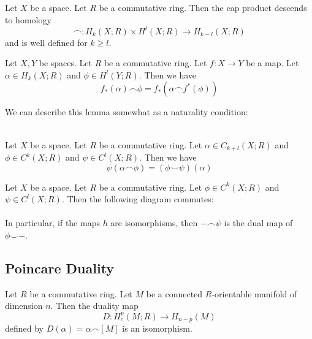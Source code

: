 \documentclass[a4paper]{article}
\begin{document}
\begin{prp}{}{} Let $X$ be a space. Let $R$ be a commutative ring. Then the cap product descends to homology $$\frown:H_k(X;R)\times H^l(X;R)\to H_{k-l}(X;R)$$ and is well defined for $k\geq l$.
\end{prp}

\begin{lmm}{}{} Let $X,Y$ be spaces. Let $R$ be a commutative ring. Let $f:X\to Y$ be a map. Let $\alpha\in H_k(X;R)$ and $\phi\in H^l(Y;R)$. Then we have $$f_\ast(\alpha)\frown\phi=f_\ast(\alpha\frown f^\ast(\phi))$$
\end{lmm}

We can describe this lemma somewhat as a naturality condition: \\
\\

\begin{lmm}{}{} Let $X$ be a space. Let $R$ be a commutative ring. Let $\alpha\in C_{k+l}(X;R)$ and $\phi\in C^k(X;R)$ and $\psi\in C^l(X;R)$. Then we have $$\psi(\alpha\frown\phi)=(\phi\smile\psi)(\alpha)$$
\end{lmm}

\begin{prp}{}{} Let $X$ be a space. Let $R$ be a commutative ring. Let $\phi\in C^k(X;R)$ and $\psi\in C^l(X;R)$. Then the following diagram commutes: \\
\\
In particular, if the maps $h$ are isomorphisms, then $-\frown\psi$ is the dual map of $\phi\smile-$. 
\end{prp}

\subsection{Poincare Duality}
\begin{prp}{}{} Let $R$ be a commutative ring. Let $M$ be a connected $R$-orientable manifold of dimension $n$. Then the duality map $$D:H_c^p(M;R)\to H_{n-p}(M)$$ defined by $D(\alpha)=\alpha\frown[M]$ is an isomorphism. 
\end{prp}
\end{document}
